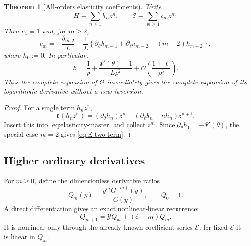 \documentclass[11pt,oneside]{article}
\numberwithin{equation}{section}
\newtheorem{theorem}{Theorem}[section]
\theoremstyle{definition}
\theoremstyle{remark}
\newcommand{\cO}{\mathcal O}
\begin{document}
\begin{theorem}[All-orders elasticity coefficients]
\label{thm:elasticity}
Write
\begin{equation}
 H=\sum_{n\ge1}h_nz^n,
 \qquad
 \mathcal E=\sum_{m\ge1}e_mz^m.
 \label{eq:E-series}
\end{equation}
Then $e_1=1$ and, for $m\ge2$,
\begin{equation}
 \boxed{
 e_m=-\frac{\delta_{m,2}}L-\frac1L
 \left\{
 \partial_\theta h_{m-1}+\partial_\ell h_{m-2}
 -(m-2)h_{m-2}
 \right\},}
 \label{eq:e-recurrence}
\end{equation}
where $h_0:=0$.  In particular,
\begin{equation}
 \mathcal E=\frac1\rho+
 \frac{\Psi'(\theta)-1}{L\rho^2}
 +\cO\left(\frac{1+\ell}{\rho^3}\right).
 \label{eq:E-two-term}
\end{equation}
Thus the complete expansion of $G$ immediately gives the complete expansion of its logarithmic derivative without a new inversion.
\end{theorem}

\begin{proof}
For a single term $h_nz^n$,
\begin{equation}
 \mathfrak d(h_nz^n)=
 (\partial_\theta h_n)z^n+
 (\partial_\ell h_n-nh_n)z^{n+1}.
 \label{eq:dfrak-term}
\end{equation}
Insert this into \cref{eq:elasticity-master} and collect $z^m$.  Since
$\partial_\theta h_1=-\Psi'(\theta)$, the special case $m=2$ gives
\cref{eq:E-two-term}.
\end{proof}

\subsection{Higher ordinary derivatives}
For $m\ge0$, define the dimensionless derivative ratios
\begin{equation}
 Q_m(y)=\frac{y^mG^{(m)}(y)}{G(y)},
 \qquad Q_0=1.
 \label{eq:Qm}
\end{equation}
A direct differentiation gives an exact nonlinear-linear recurrence:
\begin{equation}
 \boxed{
 Q_{m+1}=\mathcal YQ_m+(\mathcal E-m)Q_m.}
 \label{eq:Q-recurrence}
\end{equation}
It is nonlinear only through the already known coefficient series $\mathcal E$; for fixed $\mathcal E$ it is linear in $Q_m$.
\end{document}
